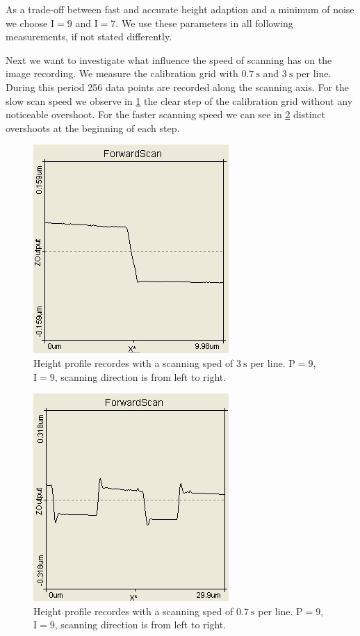 \documentclass[paper=a4,fontsize=10pt,DIV=18,twocolumn,parskip=half]{scrartcl}
\numberwithin{equation}{section}    %
\begin{document}
As a trade-off between fast and accurate height adaption and a minimum of noise we choose $\mathrm{I}=9$ and $\mathrm{I}=7$. We use these parameters in all following measurements, if not stated differently.

Next we want to investigate what influence the speed of scanning has on the image recording. We measure the calibration grid with $\SI{0.7}{\second}$ and $\SI{3}{\second}$ per line. During this period 256 data points are recorded along the scanning axis. 
For the slow scan speed we observe in \ref{slow} the clear step of the calibration grid without any noticeable overshoot. For the faster scanning speed we can see in \ref{fast} distinct overshoots at the beginning of each step.

\begin{figure}[htp]
	\begin{center}
		\includegraphics[width=0.6\columnwidth]{Bilder/slow}
		\caption{Height profile recordes with a scanning sped of $\SI{3}{\second}$ per line. $\mathrm{P}=9$, $\mathrm{I}=9$, scanning direction is from left to right.}
		\label{slow}
	\end{center}
\end{figure}

\begin{figure}[htp]
	\begin{center}
		\includegraphics[width=0.6\columnwidth]{Bilder/fast}
		\caption{Height profile recordes with a scanning sped of $\SI{0.7}{\second}$ per line. $\mathrm{P}=9$, $\mathrm{I}=9$, scanning direction is from left to right.}
		\label{fast}
	\end{center}
\end{figure}
\end{document}
